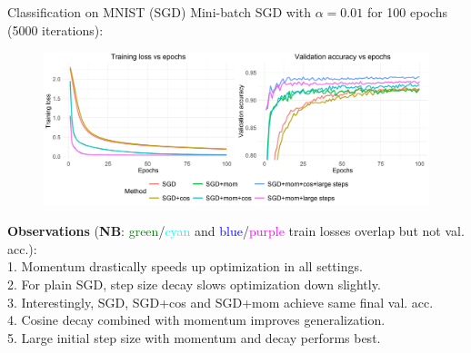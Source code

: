 \documentclass[11pt,compress,t,notes=noshow, xcolor=table]{beamer}
\begin{document}
\begin{vbframe}{Classification on MNIST (SGD)}
\vspace{-0.3cm}
Mini-batch SGD with $\alpha=0.01$ for 100 epochs (5000 iterations):
\begin{figure}
            \includegraphics[width=1.0\textwidth]{slides/04-multivariate-first-order/figure_man/simu_mnist/SGD_compar.pdf} \\
\end{figure}
{\footnotesize
\textbf{Observations} (\textbf{NB}: \textcolor{green}{green}/\textcolor{cyan}{cyan} and \textcolor{blue}{blue}/\textcolor{magenta}{purple} train losses overlap but not val. acc.):\\ 1. Momentum drastically speeds up optimization in all settings.\\
2. For plain SGD, step size decay slows optimization down slightly. \\
3. Interestingly, SGD, SGD+cos and SGD+mom achieve same final val. acc. \\
4. Cosine decay combined with momentum improves generalization. \\
5. Large initial step size with momentum and decay performs best.}
\end{vbframe}
\end{document}

